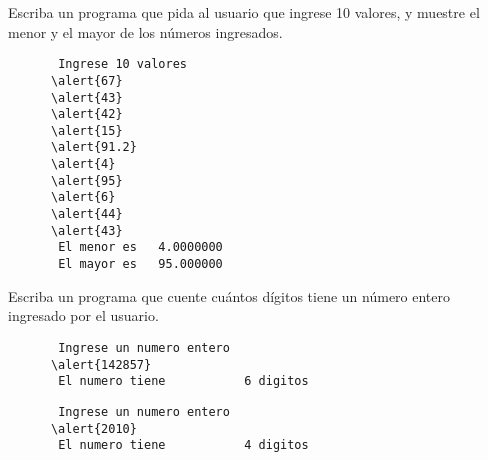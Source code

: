 \documentclass[10pt]{beamer}
\begin{document}
  \begin{frame}
    
  \end{frame}

  \begin{frame}
    
  \end{frame}

  \begin{frame}[fragile]
    Escriba un programa que pida al usuario que ingrese 10 valores,
    y muestre el menor y el mayor de los números ingresados.

    \begin{Verbatim}
       Ingrese 10 valores
      \alert{67}
      \alert{43}
      \alert{42}
      \alert{15}
      \alert{91.2}
      \alert{4}
      \alert{95}
      \alert{6}
      \alert{44}
      \alert{43}
       El menor es   4.0000000
       El mayor es   95.000000
    \end{Verbatim}

\end{frame}

  \begin{frame}
    
  \end{frame}

  \begin{frame}
    
  \end{frame}

  \begin{frame}[fragile]
    Escriba un programa que cuente
    cuántos dígitos tiene un número entero
    ingresado por el usuario.

    \begin{Verbatim}
       Ingrese un numero entero
      \alert{142857}
       El numero tiene           6 digitos
    \end{Verbatim}

    \begin{Verbatim}
       Ingrese un numero entero
      \alert{2010}
       El numero tiene           4 digitos
    \end{Verbatim}

\end{frame}

  \begin{frame}
    
  \end{frame}
\end{document}

